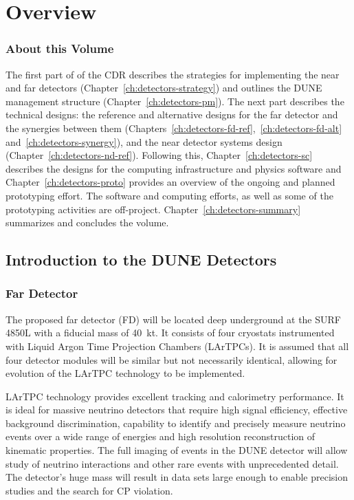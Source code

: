 \chapter{Overview}
\label{ch:detectors-overview}




\subsection{About this Volume}

The first part of \voldune{} of the CDR describes the strategies for
implementing the near and far detectors
(Chapter~\ref{ch:detectors-strategy}) and outlines the DUNE management
structure (Chapter~\ref{ch:detectors-pm}). The next part describes the
technical designs: the reference and alternative designs for the far
detector and the synergies between them
(Chapters~\ref{ch:detectors-fd-ref},~\ref{ch:detectors-fd-alt}
and~\ref{ch:detectors-synergy}), and the near detector systems design
(Chapter~\ref{ch:detectors-nd-ref}).  Following this,
Chapter~\ref{ch:detectors-sc} describes the designs for the computing
infrastructure and physics software and
Chapter~\ref{ch:detectors-proto} provides an overview of the ongoing
and planned prototyping effort.  The software and computing efforts,
as well as some of the prototyping activities are
off-project. Chapter~\ref{ch:detectors-summary} summarizes and
concludes the volume.
 
\section{Introduction to the DUNE Detectors}
\label{sec:intro-dune-det}

\subsection{Far Detector}
\label{sec:intro-dune-far-det}

The proposed far detector (FD) will be located deep underground at the
SURF 4850L with a fiducial mass of 40~kt. It consists of four
cryostats instrumented with Liquid Argon Time Projection Chambers
(LArTPCs).  It is assumed that all four detector modules will be
similar but not necessarily identical, allowing for evolution of the
LArTPC technology to be implemented.

LArTPC technology provides excellent tracking and calorimetry
performance. It is ideal for massive neutrino detectors that require
high signal efficiency, effective background discrimination,
capability to identify and precisely measure neutrino events over a
wide range of energies and high resolution reconstruction of kinematic
properties. The full imaging of events in the DUNE detector will allow
study of neutrino interactions and other rare events with
unprecedented detail. The detector's huge mass will result in data
sets large enough to enable precision studies and the search for CP
violation.

